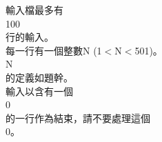 輸入檔最多有\\
100\\
行的輸入。\\
每一行有一個整數N (1$<$N$<$501)。\\
N\\
的定義如題幹。\\
輸入以含有一個\\
0\\
的一行作為結束，請不要處理這個\\
0。\\

